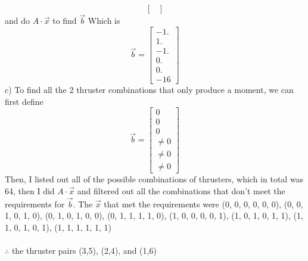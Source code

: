 \documentclass[12pt]{exam}
\begin{document}
\begin{questions}
\begin{solutionorbox}[\stretch{1}]
\[\begin{bmatrix}
\end{bmatrix}
\]
and do \(A \cdot \vec{x}\) to find \(\vec{b}\) Which is
\[\vec{b} = \begin{bmatrix}
 -1. \\ 1. \\ -1. \\ 0. \\ 0. \\ -16 
\end{bmatrix}
\]
c)
To find all the 2 thruster combinations that only produce a moment, we can first define \[\vec{b} = \begin{bmatrix}
  0\\0\\0\\ \neq 0 \\ \neq 0 \\ \neq 0
\end{bmatrix}
\]
Then, I listed out all of the possible combinations of thrusters, which in total was 64, then I did \(A \cdot \vec{x}\) and filtered out all the combinations that don't meet the requirements for \(\vec{b}\).
The \(\vec{x}\) that met the requirements were (0, 0, 0, 0, 0, 0), (0, 0, 1, 0, 1, 0), (0, 1, 0, 1, 0, 0), (0, 1, 1, 1, 1, 0), (1, 0, 0, 0, 0, 1), (1, 0, 1, 0, 1, 1), (1, 1, 0, 1, 0, 1), (1, 1, 1, 1, 1, 1)
\\
\\
\(\therefore\) the thruster pairs (3,5), (2,4), and (1,6)
\end{solutionorbox}


\end{questions}
\end{document}
